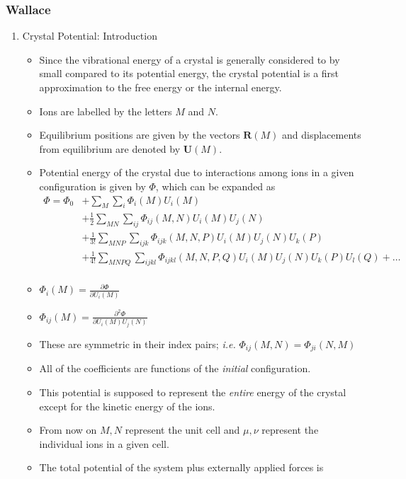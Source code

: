 \documentclass[11pt]{article}
\begin{document}
\subsubsection{Wallace}
\label{sec:org7405681}
\begin{enumerate}
\item Crystal Potential: Introduction
\label{sec:orgf2336e5}
\begin{itemize}
\item Since the vibrational energy of a crystal is generally considered to by
small compared to its potential energy, the crystal potential is a first
approximation to the free energy or the internal energy.
\item Ions are labelled by the letters \(M\) and \(N\).
\item Equilibrium positions are given by the vectors \(\mathbf{R}(M)\) and
displacements from equilibrium are denoted by \(\mathbf{U}(M)\).
\item Potential energy of the crystal due to interactions among ions in a
given configuration is given by \(\Phi\), which can be expanded as
\begin{align}
\Phi = \Phi_{0} &+ \sum_{M}\sum_{i} \Phi_{i}(M)U_{i}(M) \\ 
     &+ \frac{1}{2}\sum_{MN}\sum_{ij}\Phi_{ij}(M,N)U_i(M)U_j(N)\\ 
     &+ \frac{1}{3!} \sum_{MNP}\sum_{ijk}\Phi_{ijk}(M,N,P)U_{i}(M)U_{j}(N)U_{k}(P) \\
     &+ \frac{1}{4!} \sum_{MNPQ}\sum_{ijkl}\Phi_{ijkl}(M,N,P,Q)U_{i}(M)U_{j}(N)U_{k}(P)U_{l}(Q) + \dots \\
\end{align}
\item \(\Phi_{i}(M) = \frac{\partial \Phi}{\partial U_{i}(M)}\)
\item \(\Phi_{ij}(M) = \frac{\partial^{2} \Phi}{\partial U_{i}(M)U_{j}(N)}\)
\item These are symmetric in their index pairs; \emph{i.e.} \(\Phi_{ij}(M,N) = \Phi_{ji}(N,M)\)
\item All of the coefficients are functions of the \emph{initial} configuration.
\item This potential is supposed to represent the \emph{entire} energy of the crystal
except for the kinetic energy of the ions.
\item From now on \(M, N\) represent the unit cell and \(\mu, \nu\) represent the
individual ions in a given cell.
\item The total potential of the system plus externally applied forces is

\end{itemize}
\end{enumerate}
\end{document}
